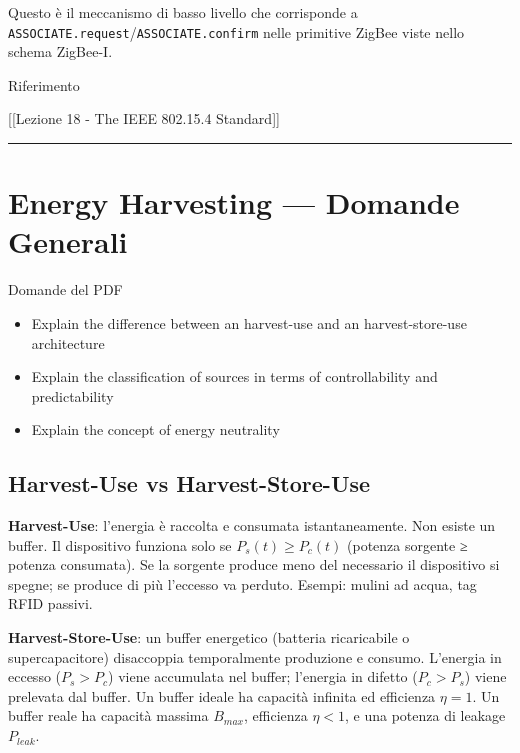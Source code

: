 \documentclass[
  italian,
  openany]{book}
\providecommand{\tightlist}{%
  \setlength{\itemsep}{0pt}\setlength{\parskip}{0pt}}
\begin{document}
Questo è il meccanismo di basso livello che corrisponde a
\texttt{ASSOCIATE.request}/\texttt{ASSOCIATE.confirm} nelle primitive
ZigBee viste nello schema ZigBee-I.

\begin{calloutnote}{Riferimento}

{[}{[}Lezione 18 - The IEEE 802.15.4 Standard{]}{]}

\end{calloutnote}

\begin{center}\rule{0.5\linewidth}{0.5pt}\end{center}

\section{Energy Harvesting --- Domande
Generali}\label{energy-harvesting-domande-generali}

\begin{calloutquestion}{Domande del PDF}

\begin{itemize}
\tightlist
\item
  Explain the difference between an harvest-use and an harvest-store-use
  architecture
\item
  Explain the classification of sources in terms of controllability and
  predictability
\item
  Explain the concept of energy neutrality
\end{itemize}

\end{calloutquestion}

\subsection{Harvest-Use vs
Harvest-Store-Use}\label{harvest-use-vs-harvest-store-use}

\textbf{Harvest-Use}: l'energia è raccolta e consumata istantaneamente.
Non esiste un buffer. Il dispositivo funziona solo se
\(P_s(t) \geq P_c(t)\) (potenza sorgente ≥ potenza consumata). Se la
sorgente produce meno del necessario il dispositivo si spegne; se
produce di più l'eccesso va perduto. Esempi: mulini ad acqua, tag RFID
passivi.

\textbf{Harvest-Store-Use}: un buffer energetico (batteria ricaricabile
o supercapacitore) disaccoppia temporalmente produzione e consumo.
L'energia in eccesso (\(P_s > P_c\)) viene accumulata nel buffer;
l'energia in difetto (\(P_c > P_s\)) viene prelevata dal buffer. Un
buffer ideale ha capacità infinita ed efficienza \(\eta = 1\). Un buffer
reale ha capacità massima \(B_{max}\), efficienza \(\eta < 1\), e una
potenza di leakage \(P_{leak}\).
\end{document}
